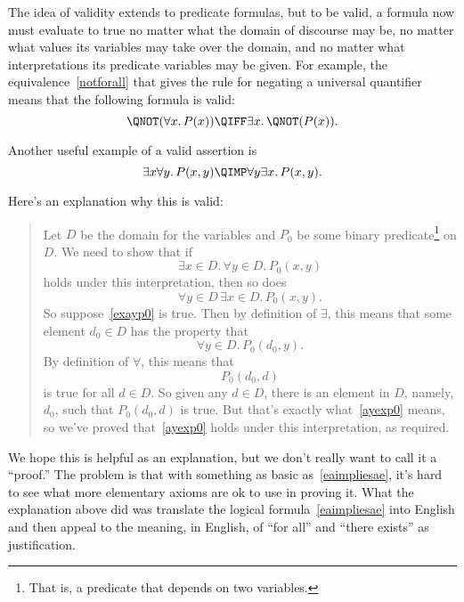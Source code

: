 The idea of validity  extends to predicate
formulas, but to be valid, a formula now must evaluate to true no
matter what the domain of discourse may be, no matter what values its
variables may take over the domain, and no matter what interpretations
its predicate variables may be given.  For example, the
equivalence~\eqref{notforall} that gives the rule for negating a
universal quantifier means that the following formula is valid:
\begin{equation}\label{notforall-equiv}
\QNOT(\forall x.\, P(x)) 
\QIFF  
\exists x.\, \QNOT(P(x)).
\end{equation}

Another useful example of a valid assertion is
\begin{equation}\label{eaimpliesae}
\exists x \forall y.\, P(x,y) \QIMP \forall y \exists x.\, P(x,y).
\end{equation}

Here's an explanation why this is valid:

\begin{quote}
Let $D$ be the domain for the variables and $P_0$ be some
binary predicate\footnote{That is, a predicate that depends on two variables.}
on $D$.  We need to show that if
\begin{equation}\label{exayp0}
\exists x \in D.\, \forall y \in D.\, P_0(x,y)
\end{equation}
holds under this interpretation, then so does
\begin{equation}\label{ayexp0}
\forall y \in D\, \exists x \in D.\, P_0(x,y).
\end{equation}
So suppose~\eqref{exayp0} is true.  Then by definition of $\exists$, this
means that some element $d_0 \in D$ has the property that
\[
\forall y \in D.\, P_0(d_0, y).
\]
By definition of $\forall$, this means that
\[
P_0(d_0,d)
\]
is true for all $d \in D$.  So given any $d \in D$, there is an element in
$D$, namely, $d_0$, such that $P_0(d_0,d)$ is true.  But that's exactly
what~\eqref{ayexp0} means, so we've proved that~\eqref{ayexp0} holds under
this interpretation, as required.
\end{quote}

We hope this is helpful as an explanation, but we don't really want to
call it a ``proof.''  The problem is that with something as basic
as~\eqref{eaimpliesae}, it's hard to see what more elementary axioms
are ok to use in proving it.  What the explanation above did was
translate the logical formula~\eqref{eaimpliesae} into English and
then appeal to the meaning, in English, of ``for all'' and ``there
exists'' as justification.

